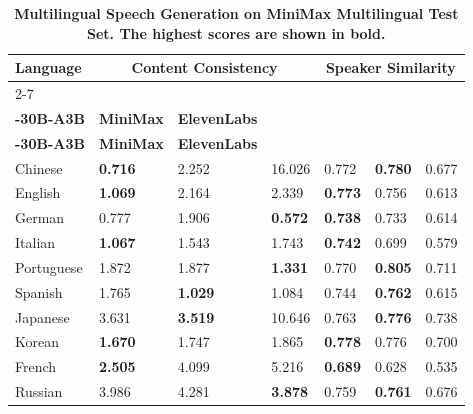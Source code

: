 \begin{table}[H]
\centering
\caption{\textbf{Multilingual Speech Generation on MiniMax Multilingual Test Set. The highest scores are shown in bold.}}
\begin{tabular}{@{}lllllll@{}}
\toprule
\multirow{2}{*}{\textbf{Language}} & \multicolumn{3}{c}{\textbf{Content Consistency}}      & \multicolumn{3}{c}{\textbf{Speaker Similarity}}           \\ \cmidrule(l){2-7} 
                          & \tabincell{c}{\textbf{\method}\\\textbf{-30B-A3B}}       & \textbf{MiniMax} & \textbf{ElevenLabs} & \tabincell{c}{\textbf{\method}\\\textbf{-30B-A3B}}       & \textbf{MiniMax} & \textbf{ElevenLabs} \\ \midrule
Chinese                    & \textbf{0.716} & 2.252   & 16.026      & 0.772          & \textbf{0.780}   & 0.677      \\
English                    & \textbf{1.069} & 2.164   & 2.339      & \textbf{0.773}          & 0.756   & 0.613      \\
German                    & 0.777 & 1.906   & \textbf{0.572}      & \textbf{0.738}          & 0.733   & 0.614      \\
Italian                   & \textbf{1.067} & 1.543   & 1.743      & \textbf{0.742} & 0.699   & 0.579      \\
Portuguese                & 1.872          & 1.877   & \textbf{1.331}      & 0.770          & \textbf{0.805}   & 0.711      \\
Spanish                   & 1.765          & \textbf{1.029}   & 1.084      & 0.744 & \textbf{0.762}   & 0.615      \\
Japanese                  & 3.631          & \textbf{3.519}   & 10.646     & 0.763 & \textbf{0.776}   & 0.738      \\
Korean                    & \textbf{1.670}          & 1.747   & 1.865      & \textbf{0.778} & 0.776   & 0.700      \\
French                    & \textbf{2.505} & 4.099   & 5.216      & \textbf{0.689} & 0.628   & 0.535      \\
Russian                   & 3.986          & 4.281   & \textbf{3.878}      & 0.759          & \textbf{0.761}   & 0.676      \\ \bottomrule
\end{tabular}
\label{tab:multilingual_speech_generation_table}
\end{table}



